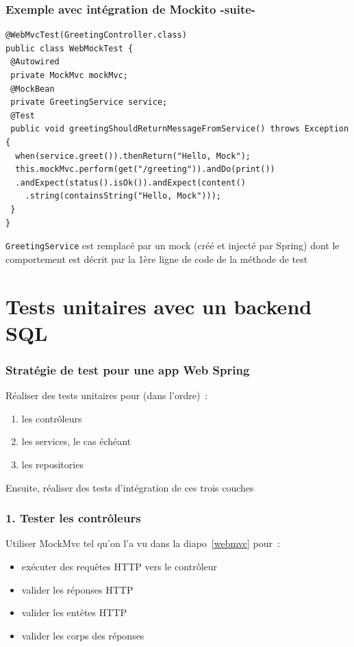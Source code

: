 \documentclass{beamer}
\begin{document}
\begin{frame}[fragile]
	\frametitle{Exemple avec intégration de Mockito -suite-}
\begin{lstlisting}
@WebMvcTest(GreetingController.class)
public class WebMockTest {	
 @Autowired
 private MockMvc mockMvc;
 @MockBean
 private GreetingService service;	
 @Test
 public void greetingShouldReturnMessageFromService() throws Exception {
  when(service.greet()).thenReturn("Hello, Mock");
  this.mockMvc.perform(get("/greeting")).andDo(print())
  .andExpect(status().isOk()).andExpect(content()
    .string(containsString("Hello, Mock")));
 }
}
\end{lstlisting}
\texttt{GreetingService} est remplacé par un mock (créé et injecté par Spring) dont le comportement est décrit par la 1ère ligne de code de la méthode de test
\end{frame}

\section{Tests unitaires avec un backend SQL}

\begin{frame}
	\frametitle{Stratégie de test pour une app Web Spring}
	Réaliser des tests unitaires pour (dans l'ordre)~:
	\begin{enumerate}
		\item les contrôleurs
		\item les services, le cas échéant
		\item les repositories
	\end{enumerate}
	Ensuite, réaliser des tests d'intégration de ces trois couches
\end{frame}

\begin{frame}
	\frametitle{1. Tester les contrôleurs}
	Utiliser MockMvc tel qu'on l'a vu dans la diapo~{\color{blue}\ref{webmvc}} pour~:
\begin{itemize}
	\item exécuter des requêtes HTTP vers le contrôleur
	\item valider les réponses HTTP
	\item valider les entêtes HTTP
	\item valider les corps des réponses
\end{itemize}
\end{frame}
\end{document}

